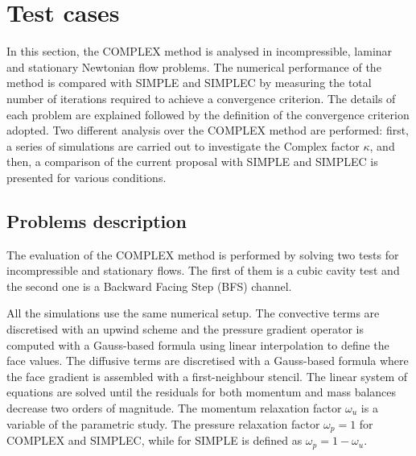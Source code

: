 \documentclass[final,3p,times,11pt,onecolumn]{myElsarticle}
\numberwithin{equation}{section}
\begin{document}
\section{Test cases}
\label{sec:cases}

In this section, the COMPLEX method is analysed in incompressible, laminar and stationary Newtonian flow problems. The numerical performance of the method is compared with SIMPLE and SIMPLEC by measuring the total number of iterations required to achieve a convergence criterion. The details of each problem are explained followed by the definition of the convergence criterion adopted. Two different analysis over the COMPLEX method are performed: first, a series of simulations are carried out to investigate the Complex factor $\kappa$, and then, a comparison of the current proposal with SIMPLE and SIMPLEC is presented for various conditions. 

\subsection{Problems description}\label{Section:problemDescription}
 The evaluation of the COMPLEX method is performed by solving two tests for incompressible and stationary flows. The first of them is a cubic cavity test and the second one is a Backward Facing Step (BFS) channel.

All the simulations use the same numerical setup. The convective terms are discretised with an upwind scheme and the pressure gradient operator is computed with a Gauss-based formula using linear interpolation to define the face values. The diffusive terms are discretised with a Gauss-based formula where the face gradient is assembled with a first-neighbour stencil. The linear system of equations are solved until the residuals for both momentum and mass balances decrease two orders of magnitude. The momentum relaxation factor $\omega_u$ is a variable of the parametric study. The pressure relaxation factor $\omega_p = 1$ for COMPLEX and SIMPLEC, while for SIMPLE is defined as $\omega_p = 1 - \omega_u$.
\end{document}
